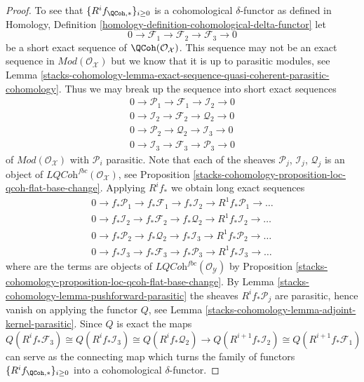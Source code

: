 \begin{proof}
\medskip\noindent
To see that $\{R^if_{\QCoh, *}\}_{i \geq 0}$ is a cohomological
$\delta$-functor as defined in
Homology, Definition \ref{homology-definition-cohomological-delta-functor}
let
$$
0 \to \mathcal{F}_1 \to \mathcal{F}_2 \to \mathcal{F}_3 \to 0
$$
be a short exact sequence of $\QCoh(\mathcal{O}_\mathcal{X})$.
This sequence may not be an exact sequence in
$\textit{Mod}(\mathcal{O}_\mathcal{X})$ but we know that it is
up to parasitic modules, see
Lemma \ref{stacks-cohomology-lemma-exact-sequence-quasi-coherent-parasitic-cohomology}.
Thus we may break up the sequence into short exact sequences
$$
\begin{matrix}
0 \to \mathcal{P}_1 \to \mathcal{F}_1 \to \mathcal{I}_2 \to 0 \\
0 \to \mathcal{I}_2 \to \mathcal{F}_2 \to \mathcal{Q}_2 \to 0 \\
0 \to \mathcal{P}_2 \to \mathcal{Q}_2 \to \mathcal{I}_3 \to 0 \\
0 \to \mathcal{I}_3 \to \mathcal{F}_3 \to \mathcal{P}_3 \to 0
\end{matrix}
$$
of $\textit{Mod}(\mathcal{O}_\mathcal{X})$ with $\mathcal{P}_i$ parasitic.
Note that each of the sheaves
$\mathcal{P}_j$, $\mathcal{I}_j$, $\mathcal{Q}_j$ is an object of
$\textit{LQCoh}^{fbc}(\mathcal{O}_\mathcal{X})$, see
Proposition \ref{stacks-cohomology-proposition-loc-qcoh-flat-base-change}.
Applying $R^if_*$ we obtain long exact sequences
$$
\begin{matrix}
0 \to f_*\mathcal{P}_1 \to f_*\mathcal{F}_1 \to f_*\mathcal{I}_2 \to
R^1f_*\mathcal{P}_1 \to \ldots \\
0 \to f_*\mathcal{I}_2 \to f_*\mathcal{F}_2 \to f_*\mathcal{Q}_2 \to
R^1f_*\mathcal{I}_2 \to \ldots \\
0 \to f_*\mathcal{P}_2 \to f_*\mathcal{Q}_2 \to f_*\mathcal{I}_3 \to
R^1f_*\mathcal{P}_2 \to \ldots \\
0 \to f_*\mathcal{I}_3 \to f_*\mathcal{F}_3 \to f_*\mathcal{P}_3 \to
R^1f_*\mathcal{I}_3 \to \ldots
\end{matrix}
$$
where are the terms are objects of
$\textit{LQCoh}^{fbc}(\mathcal{O}_\mathcal{Y})$ by
Proposition \ref{stacks-cohomology-proposition-loc-qcoh-flat-base-change}.
By
Lemma \ref{stacks-cohomology-lemma-pushforward-parasitic}
the sheaves $R^if_*\mathcal{P}_j$ are parasitic, hence vanish on applying
the functor $Q$, see
Lemma \ref{stacks-cohomology-lemma-adjoint-kernel-parasitic}.
Since $Q$ is exact the maps
$$
Q(R^if_*\mathcal{F}_3)
\cong
Q(R^if_*\mathcal{I}_3)
\cong
Q(R^if_*\mathcal{Q}_2)
\rightarrow
Q(R^{i + 1}f_*\mathcal{I}_2)
\cong
Q(R^{i + 1}f_*\mathcal{F}_1)
$$
can serve as the connecting map which turns the family of functors
$\{R^if_{\QCoh, *}\}_{i \geq 0}$
into a cohomological $\delta$-functor.
\end{proof}

